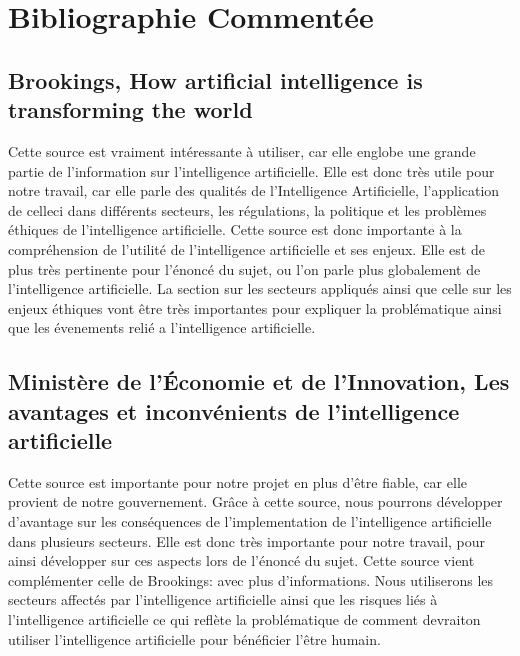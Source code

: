 \documentclass[letterpaper,10pt,french]{sphinxmanual}
\begin{document}
\section{Bibliographie Commentée}
\label{\detokenize{biblio_commented:bibliographie-commentee}}\label{\detokenize{biblio_commented::doc}}

\subsection{Brookings, How artificial intelligence is transforming the world}
\label{\detokenize{biblio_commented:brookings-how-artificial-intelligence-is-transforming-the-world}}

Cette source est vraiment intéressante à utiliser, car elle englobe une
grande partie de l’information sur l’intelligence artificielle. Elle est donc très utile pour notre
travail, car elle parle des qualités de l’Intelligence Artificielle, l’application de
celle\sphinxhyphen{}ci dans différents secteurs, les régulations, la politique et les problèmes éthiques de
l’intelligence artificielle. Cette source est donc importante à la compréhension de l’utilité
de l’intelligence artificielle et ses enjeux. Elle est de plus très pertinente pour l’énoncé du sujet,
ou l’on parle plus globalement de l’intelligence artificielle. La section sur les secteurs appliqués
ainsi que celle sur les enjeux éthiques vont être très importantes pour expliquer la problématique
ainsi que les évenements relié a l’intelligence artificielle.


\subsection{Ministère de l’Économie et de l’Innovation, Les avantages et inconvénients de l’intelligence artificielle}
\label{\detokenize{biblio_commented:ministere-de-l-economie-et-de-l-innovation-les-avantages-et-inconvenients-de-l-intelligence-artificielle}}

Cette source est importante pour notre projet en plus d’être fiable,
car elle provient de notre gouvernement. Grâce à cette source, nous pourrons développer d’avantage
sur les conséquences de l’implementation de l’intelligence artificielle dans plusieurs secteurs.
Elle est donc très importante pour notre travail, pour ainsi développer sur ces aspects lors de l’énoncé du sujet.
Cette source vient complémenter celle de Brookings: 
avec plus d’informations. Nous utiliserons les secteurs affectés par l’intelligence artificielle ainsi
que les risques liés à l’intelligence artificielle ce qui reflète la problématique de comment devrait\sphinxhyphen{}on
utiliser l’intelligence artificielle pour bénéficier l’être humain.
\end{document}

